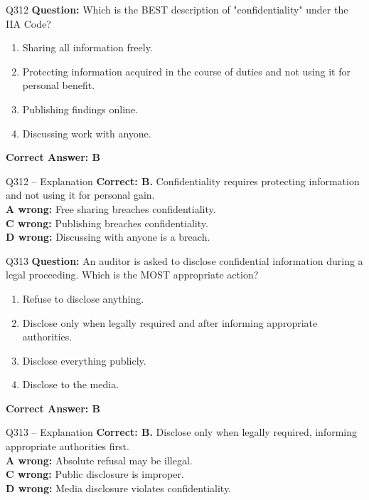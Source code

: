 \documentclass[aspectratio=169,10pt]{beamer}
\begin{document}
	\begin{frame}[t]{Q312}
		\small
		\textbf{Question:} Which is the BEST description of "confidentiality" under the IIA Code?
		\begin{enumerate}[label=\Alph*.,itemsep=1pt,topsep=2pt]
			\item Sharing all information freely.
			\item Protecting information acquired in the course of duties and not using it for personal benefit.
			\item Publishing findings online.
			\item Discussing work with anyone.
		\end{enumerate}
		\vspace{4pt}
		\textbf{Correct Answer: B}
	\end{frame}
	
	\begin{frame}[t]{Q312 -- Explanation}
		\small
		\textbf{Correct: B.} Confidentiality requires protecting information and not using it for personal gain. \\[4pt]
		\textbf{A wrong:} Free sharing breaches confidentiality. \\[2pt]
		\textbf{C wrong:} Publishing breaches confidentiality. \\[2pt]
		\textbf{D wrong:} Discussing with anyone is a breach.
	\end{frame}
	
	\begin{frame}[t]{Q313}
		\small
		\textbf{Question:} An auditor is asked to disclose confidential information during a legal proceeding. Which is the MOST appropriate action?
		\begin{enumerate}[label=\Alph*.,itemsep=1pt,topsep=2pt]
			\item Refuse to disclose anything.
			\item Disclose only when legally required and after informing appropriate authorities.
			\item Disclose everything publicly.
			\item Disclose to the media.
		\end{enumerate}
		\vspace{4pt}
		\textbf{Correct Answer: B}
	\end{frame}
	
	\begin{frame}[t]{Q313 -- Explanation}
		\small
		\textbf{Correct: B.} Disclose only when legally required, informing appropriate authorities first. \\[4pt]
		\textbf{A wrong:} Absolute refusal may be illegal. \\[2pt]
		\textbf{C wrong:} Public disclosure is improper. \\[2pt]
		\textbf{D wrong:} Media disclosure violates confidentiality.
	\end{frame}
	
\end{document}
